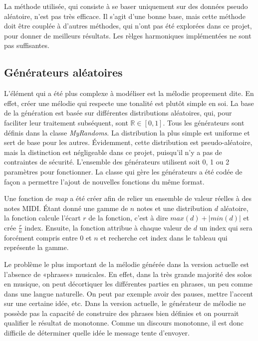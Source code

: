 \documentclass[letterpaper,12pt]{scrartcl}
\begin{document}
	La méthode utilisée, qui consiste à se baser uniquement sur des données pseudo aléatoire, n'est pas très efficace. Il s'agit d'une bonne base, mais cette méthode doit être couplée à d'autres méthodes, qui n'ont pas été explorées dans ce projet, pour donner de meilleurs résultats. Les rèlges harmoniques implémentées ne sont pas suffisantes. 

	\subsection{Générateurs aléatoires}
	L'élément qui a été plus complexe à modéliser est la mélodie proprement dite. En effet, créer une mélodie qui respecte une tonalité est plutôt simple en soi. La base de la génération est basée sur différentes distributions aléatoires, qui, pour faciliter leur traitement subséquent, sont $\mathbb{R} \in [0,1]$. Tous les générateurs sont définis dans la classe \textit{MyRandoms}. La distribution la plus simple est uniforme et sert de base pour les autres. Évidemment, cette distribution est pseudo-aléatoire, mais la distinction est négligeable dans ce projet, puisqu'il n'y a pas de contraintes de sécurité. L'ensemble des générateurs utilisent soit 0, 1 ou 2 paramètres pour fonctionner. La classe qui gère les générateurs a été codée de façon a permettre l'ajout de nouvelles fonctions du même format. 
	
	Une fonction de \textit{map} a été créer afin de relier un ensemble de valeur réelles à des notes MIDI. Étant donné une gamme de $n$ notes et une distribution $d$ aléatoire, la fonction calcule l'écart $r$ de la fonction, c'est à dire $max(d) + |min(d)|$ et crée $\frac{r}{n}$ index. Ensuite, la fonction attribue à chaque valeur de $d$ un index qui sera forcément compris entre 0 et $n$ et recherche cet index dans le tableau qui représente la gamme.
	
	Le problème le plus important de la mélodie générée dans la version actuelle est l'absence de «phrases» musicales. En effet, dans la très grande majorité des solos en musique, on peut décortiquer les différentes parties en phrases, un peu comme dans une langue naturelle. On peut par exemple avoir des pauses, mettre l'accent sur une certaine idée, etc. Dans la version actuelle, le générateur de mélodie ne possède pas la capacité de construire des phrases bien définies et on pourrait qualifier le résultat de monotonne. Comme un discours monotonne, il est donc difficile de déterminer quelle idée le message tente d'envoyer.
	
\end{document}

